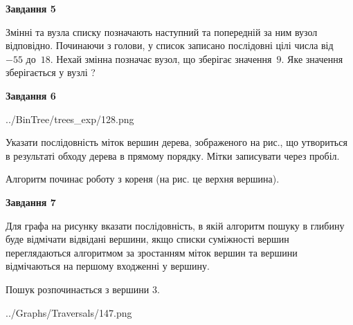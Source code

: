 \documentclass[12pt, ukrainian]{article}
\begin{document}
{\begin {large}
{\begin {center}\textbf{Завдання 5}\end {center}}\par
Змінні  та  вузла списку позначають наступний та попередній за ним вузол відповідно. Починаючи з голови, у список записано послідовні цілі числа від~$-55$ до~$18$. Нехай змінна  позначає вузол, що зберігає значення~$9$.
Яке значення зберігається у вузлі  ?\par
\newpage

{\begin {center}\textbf{Завдання 6}\end {center}}\par

\begin{center}
	{../BinTree/trees_exp/128.png}
\end{center}
Указати послідовність міток вершин дерева, зображеного на рис., що утвориться в результаті обходу дерева в прямому порядку. Мітки записувати через пробіл.\par Алгоритм починає роботу з кореня (на рис. це верхня вершина).\par
\newpage

{\begin {center}\textbf{Завдання 7}\end {center}}\par
Для графа на рисунку вказати послідовність, в якій алгоритм пошуку в глибину буде відмічати відвідані вершини, якщо списки суміжності вершин переглядаються алгоритмом за зростанням міток вершин та вершини відмічаються на першому вход\-женні у вершину.\par
Пошук розпочинається з вершини 3.\par

\begin{center}
	{../Graphs/Traversals/147.png}
\end{center}\par
\newpage


\end{large}}
\end{document}
